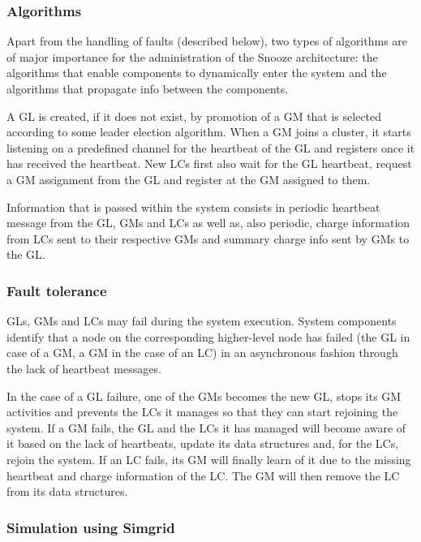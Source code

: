 \subsubsection{Algorithms}
\label{sec:snoozeAlgs}

Apart from the handling of faults (described below), two types of
algorithms are of major importance for the administration of the
Snooze architecture: the algorithms that enable components to
dynamically enter the system and the algorithms that propagate info
between the components.

A GL is created, if it does not exist, by promotion of a GM that is
selected according to some leader election algorithm. When a GM joins
a cluster, it starts listening on a predefined channel for the
heartbeat of the GL and registers once it has received the
heartbeat. New LCs first also wait for the GL heartbeat, request a GM
assignment from the GL and register at the GM assigned to them.

Information that is passed within the system consists in periodic
heartbeat message from the GL, GMs and LCs as well as, also periodic,
charge information from LCs sent to their respective GMs and summary
charge info sent by GMs to the GL.

\subsubsection{Fault tolerance}

GLs, GMs and LCs may fail during the system execution. System
components identify that a node on the corresponding higher-level node
has failed (the GL in case of a GM, a GM in the case of an LC) in an
asynchronous fashion through the lack of heartbeat messages.

In the case of a GL failure, one of the GMs becomes the new GL, stops
its GM activities and prevents the LCs it manages so that they can
start rejoining the system. If a GM fails, the GL and the LCs it has
managed will become aware of it based on the lack of heartbeats,
update its data structures and, for the LCs, rejoin the system. If an
LC fails, its GM will finally learn of it due to the missing heartbeat
and charge information of the LC. The GM will then remove the LC from
its data structures.


\subsubsection{Simulation using Simgrid}

